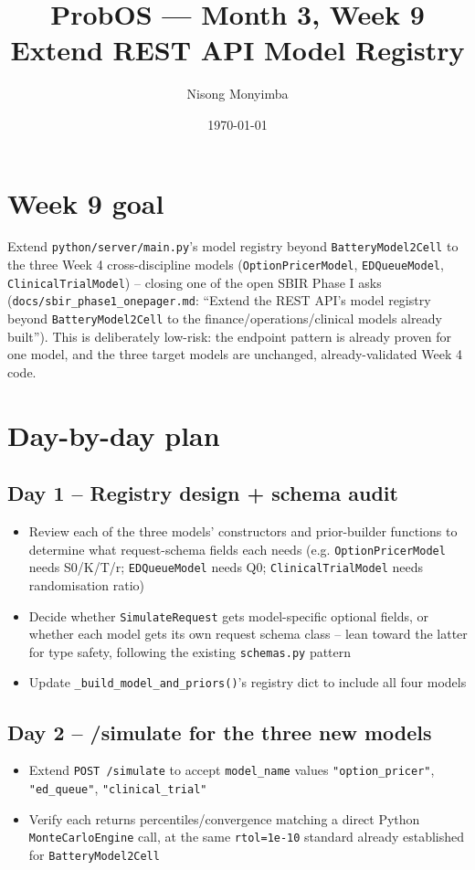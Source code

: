 \documentclass[11pt]{article}
\title{ProbOS --- Month 3, Week 9\\Extend REST API Model Registry}
\author{Nisong Monyimba}
\date{\today}
\begin{document}
\maketitle

\section*{Week 9 goal}
Extend \texttt{python/server/main.py}'s model registry beyond
\texttt{BatteryModel2Cell} to the three Week 4 cross-discipline models
(\texttt{OptionPricerModel}, \texttt{EDQueueModel},
\texttt{ClinicalTrialModel}) -- closing one of the open SBIR Phase I
asks (\texttt{docs/sbir\_phase1\_onepager.md}: ``Extend the REST API's
model registry beyond \texttt{BatteryModel2Cell} to the
finance/operations/clinical models already built''). This is
deliberately low-risk: the endpoint pattern is already proven for one
model, and the three target models are unchanged, already-validated
Week 4 code.

\section*{Day-by-day plan}

\subsection*{Day 1 -- Registry design + schema audit}
\begin{itemize}[leftmargin=*]
  \item Review each of the three models' constructors and
    prior-builder functions to determine what request-schema fields
    each needs (e.g. \texttt{OptionPricerModel} needs S0/K/T/r;
    \texttt{EDQueueModel} needs Q0; \texttt{ClinicalTrialModel} needs
    randomisation ratio)
  \item Decide whether \texttt{SimulateRequest} gets model-specific
    optional fields, or whether each model gets its own request
    schema class -- lean toward the latter for type safety, following
    the existing \texttt{schemas.py} pattern
  \item Update \texttt{\_build\_model\_and\_priors()}'s registry dict
    to include all four models
\end{itemize}

\subsection*{Day 2 -- /simulate for the three new models}
\begin{itemize}[leftmargin=*]
  \item Extend \texttt{POST /simulate} to accept
    \texttt{model\_name} values \texttt{"option\_pricer"},
    \texttt{"ed\_queue"}, \texttt{"clinical\_trial"}
  \item Verify each returns percentiles/convergence matching a direct
    Python \texttt{MonteCarloEngine} call, at the same
    \texttt{rtol=1e-10} standard already established for
    \texttt{BatteryModel2Cell}
\end{itemize}
\end{document}
